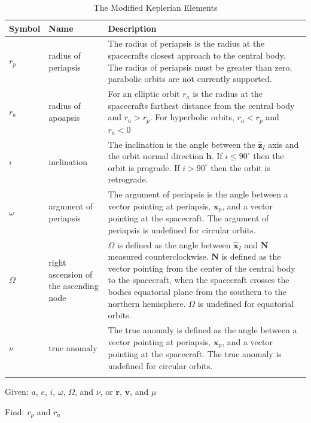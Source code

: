 \begin{table} \caption{The Modified Keplerian Elements}
\centering{}
\begin{tabular}{p{.5 in} p{1.5 in} p{3.5 in}}
  \hline\hline
   Symbol & Name & Description \\
  \hline
  $r_p$ & radius of periapsis & The radius of periapsis is the radius at the spacecrafts closest approach to the central body.  The radius of periapsis must be greater than zero, parabolic orbits are not currently supported. \\
%
  $r_a$ & radius of apoapsis  &  For an elliptic orbit $r_a$ is the radius at the spacecrafts farthest distance from the central body and $r_a>r_p$.  For hyperbolic orbits, $r_a<r_p$ and $r_a < 0 $  \\
  $i$ & inclination & The inclination is the angle between the $\hat{\mathbf{z}}_I$ axis and the orbit normal direction $\mathbf{h}$.  If $i \leq 90^{\circ}$ then the orbit is prograde.
  If $i > 90^{\circ}$ then the orbit is retrograde.  \\
  $\omega$ & argument of periapsis & The argument of periapsis is the angle between a vector pointing at periapsis,
  $\mathbf{x}_p$, and a vector pointing at the spacecraft. The argument of periapsis is undefined for circular orbits.\\
  $\Omega$ & right ascension of  the ascending node& $\Omega$ is defined as the angle between $\hat{\mathbf{x}}_I$ and $\mathbf{N}$ measured
  counterclockwise.
    $\mathbf{N}$ is defined as the vector pointing from the center of the central body to the spacecraft, when the spacecraft crosses the bodies equatorial plane
  from the southern to the northern hemisphere.  $\Omega$ is undefined for equatorial orbits.   \\
  $\nu$ & true anomaly & The true anomaly is defined as the angle between a vector pointing at periapsis, $\mathbf{x}_p$, and a vector pointing at the spacecraft.
  The true anomaly is undefined for circular orbits. \\
  \hline\hline \label{Table:ModKeplerianElements}
\end{tabular}
\end{table}


\noindent Given:  $a$, $e$, $i$, $\omega$, $\Omega$, and $\nu$, or
$\mathbf{r}$, $\mathbf{v}$, and $\mu$

\noindent Find:  $r_p$ and $r_a$

